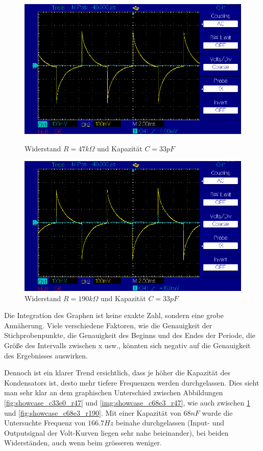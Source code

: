 \documentclass{article}
\begin{document}
\begin{figure}[ht]
    \endminipage\hfill
        \centering
        \includegraphics[width=\linewidth]{figures/results/resistor_47_Ohm/c33pF.png}
        \caption{Widerstand $R = 47k\Omega$ und Kapazität $C = 33pF$}
        \label{fig:showcase_c33e0_r47}
    \endminipage\hfill
        \centering
        \includegraphics[width=\linewidth]{figures/results/resistor_190_Ohm/c33pF.png}
        \caption{Widerstand $R = 190k\Omega$ und Kapazität $C = 33pF$}
        \label{fig:showcase_c33e0_r190}
    \endminipage\hfill
\end{figure}

Die Integration des Graphen ist keine exakte Zahl, sondern eine grobe Annäherung. Viele verschiedene Faktoren, wie die Genauigkeit der Stichprobenpunkte, die Genauigkeit des Beginns und des Endes der Periode, die Größe des Intervalls zwischen x usw., könnten sich negativ auf die Genauigkeit des Ergebnisses auswirken.

Dennoch ist ein klarer Trend ersichtlich, dass je höher die Kapazität des Kondensators ist, desto mehr tiefere Frequenzen werden durchgelassen. Dies sieht man sehr klar an dem graphischen Unterschied zwischen Abbildungen \ref{fig:showcase_c33e0_r47} und \ref{img:showcase_c68e3_r47}, wie auch zwischen \ref{fig:showcase_c33e0_r190} und \ref{fig:showcase_c68e3_r190}. Mit einer Kapazität von $68nF$ wurde die Untersuchte Frequenz von $166.7Hz$ beinahe durchgelassen (Input- und Outputsignal der Volt-Kurven liegen sehr nahe beieinander), bei beiden Widerständen, auch wenn beim grösseren weniger. 
\end{document}
